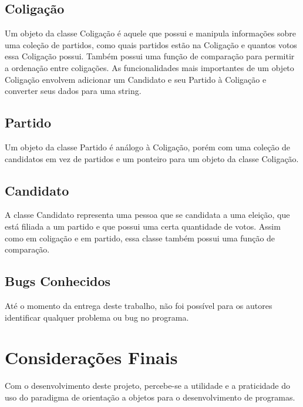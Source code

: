 \documentclass[oneside]{abntex2}
\begin{document}
	\section{Coligação}
Um objeto da classe Coligação é aquele que possui e manipula informações sobre uma coleção de partidos, como quais partidos estão na Coligação e quantos votos essa Coligação possui. Também possui uma função de comparação para permitir a ordenação entre coligações. As funcionalidades mais importantes de um objeto Coligação envolvem adicionar um Candidato e seu Partido à Coligação e converter seus dados para uma string.

	\section{Partido}
Um objeto da classe Partido é análogo à Coligação, porém com uma coleção de candidatos em vez de partidos e um ponteiro para um objeto da classe Coligação.

	\section{Candidato}
A classe Candidato representa uma pessoa que se candidata a uma eleição, que está filiada a um partido e que possui uma certa quantidade de votos. Assim como em coligação e em partido, essa classe também possui uma função de comparação.

	\section{Bugs Conhecidos}
Até o momento da entrega deste trabalho, não foi possível para os autores identificar qualquer problema ou bug no programa.

    \newpage
    \chapter{Considerações Finais}
Com o desenvolvimento deste projeto, percebe-se a utilidade e a praticidade do uso do paradigma de orientação a objetos para o desenvolvimento de programas.
\end{document}
